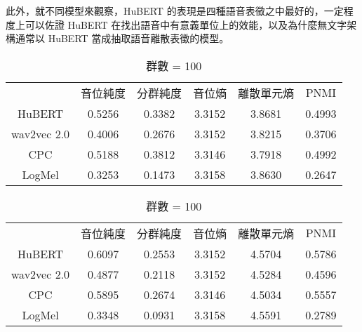 此外，就不同模型來觀察，HuBERT 的表現是四種語音表徵之中最好的，一定程度上可以佐證 HuBERT 在找出語音中有意義單位上的效能，以及為什麼無文字架構通常以 HuBERT 當成抽取語音離散表徵的模型。













\begin{table}[!htbp]
    \centering
    \begin{subtable}[t]{\textwidth}
        \centering
        \begin{tabular}{cccccc}
            & 音位純度 & 分群純度 & 音位熵 & 離散單元熵 & PNMI \\
            HuBERT      &   0.5256   &  0.3382 &   3.3152  &  3.8681    &     0.4993   \\   %
            wav2vec 2.0 &   0.4006   &  0.2676 &   3.3152  &  3.8215    &     0.3706   \\   %
            CPC         &   0.5188   &  0.3812 &   3.3146  &  3.7918    &     0.4992   \\   %
            LogMel      &   0.3253   &  0.1473 &   3.3158  &  3.8630    &     0.2647   \\   %
        \end{tabular}
        \caption{群數 = 50}
        \label{tab:ch3-clu050}
    \end{subtable}

    \vspace{0.5cm}

    \begin{subtable}[t]{\textwidth}
        \centering
        \begin{tabular}{cccccc}
            & 音位純度 & 分群純度 & 音位熵 & 離散單元熵 & PNMI \\
            HuBERT      &   0.6097   &  0.2553 &   3.3152  &  4.5704    &     0.5786   \\   %
            wav2vec 2.0 &   0.4877   &  0.2118 &   3.3152  &  4.5284    &     0.4596   \\   %
            CPC         &   0.5895   &  0.2674 &   3.3146  &  4.5034    &     0.5557   \\   %
            LogMel      &   0.3348   &  0.0931 &   3.3158  &  4.5591    &     0.2789   \\   %
        \end{tabular}
        \caption{群數 = 100}
        \label{tab:ch3-clu100}
    \end{subtable}


\end{table}
